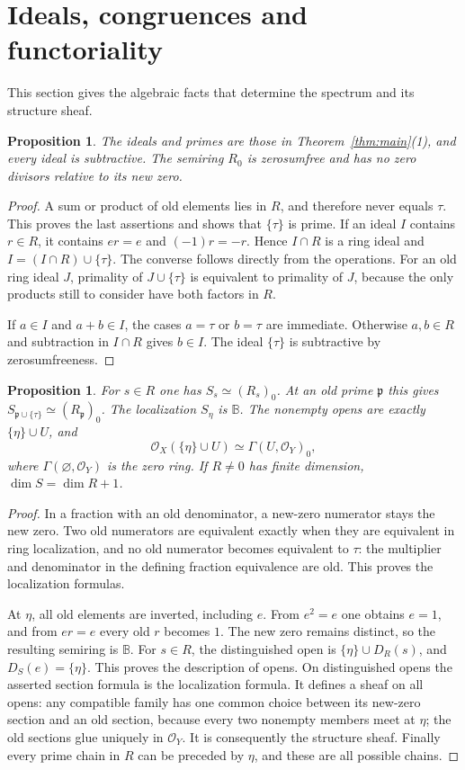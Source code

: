 \documentclass[11pt]{amsart}
\newcommand{\B}{\mathbb B}
\newtheorem{proposition}[theorem]{Proposition}
\theoremstyle{definition}
\theoremstyle{remark}
\begin{document}
\section{Ideals, congruences and functoriality}\label{sec:spectrum}
This section gives the algebraic facts that determine the spectrum and its structure sheaf.

\begin{proposition}\label{prop:ideal}
The ideals and primes are those in Theorem~\ref{thm:main}(1), and every ideal is subtractive. The semiring $R_0$ is zerosumfree and has no zero divisors relative to its new zero.
\end{proposition}
\begin{proof}
A sum or product of old elements lies in $R$, and therefore never equals $\tau$. This proves the last assertions and shows that $\{\tau\}$ is prime. If an ideal $I$ contains $r\in R$, it contains $er=e$ and $(-1)r=-r$. Hence $I\cap R$ is a ring ideal and $I=(I\cap R)\cup\{\tau\}$. The converse follows directly from the operations. For an old ring ideal $J$, primality of $J\cup\{\tau\}$ is equivalent to primality of $J$, because the only products still to consider have both factors in $R$.

If $a\in I$ and $a+b\in I$, the cases $a=\tau$ or $b=\tau$ are immediate. Otherwise $a,b\in R$ and subtraction in $I\cap R$ gives $b\in I$. The ideal $\{\tau\}$ is subtractive by zerosumfreeness.
\end{proof}

\begin{proposition}\label{prop:localization}
For $s\in R$ one has $S_s\simeq(R_s)_0$. At an old prime $\mathfrak p$ this gives $S_{\mathfrak p\cup\{\tau\}}\simeq(R_{\mathfrak p})_0$. The localization $S_{\eta}$ is $\B$. The nonempty opens are exactly $\{\eta\}\cup U$, and
\[
 \mathcal O_X(\{\eta\}\cup U)\simeq\Gamma(U,\mathcal O_Y)_0,
\]
where $\Gamma(\varnothing,\mathcal O_Y)$ is the zero ring. If $R\ne0$ has finite dimension, $\dim S=\dim R+1$.
\end{proposition}
\begin{proof}
In a fraction with an old denominator, a new-zero numerator stays the new zero. Two old numerators are equivalent exactly when they are equivalent in ring localization, and no old numerator becomes equivalent to $\tau$: the multiplier and denominator in the defining fraction equivalence are old. This proves the localization formulas.

At $\eta$, all old elements are inverted, including $e$. From $e^2=e$ one obtains $e=1$, and from $er=e$ every old $r$ becomes $1$. The new zero remains distinct, so the resulting semiring is $\B$. For $s\in R$, the distinguished open is $\{\eta\}\cup D_R(s)$, and $D_S(e)=\{\eta\}$. This proves the description of opens. On distinguished opens the asserted section formula is the localization formula. It defines a sheaf on all opens: any compatible family has one common choice between its new-zero section and an old section, because every two nonempty members meet at $\eta$; the old sections glue uniquely in $\mathcal O_Y$. It is consequently the structure sheaf. Finally every prime chain in $R$ can be preceded by $\eta$, and these are all possible chains.
\end{proof}
\end{document}
